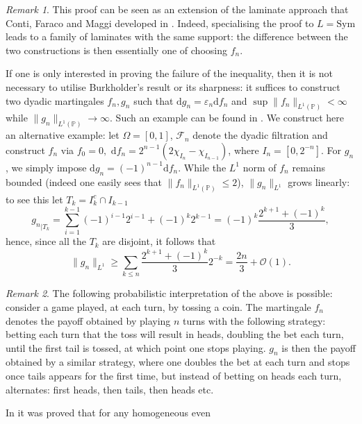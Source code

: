 \documentclass[11pt, a4paper, reqno]{elsarticle}
\theoremstyle{definition}
\theoremstyle{remark}
\newtheorem{remark}{Remark}
\begin{document}
 \begin{remark}
     This proof can be seen as an extension of
     the laminate approach that Conti, Faraco and Maggi
     developed in \cite{Conti2005AFunctions}.
     Indeed, specialising the proof to $L=\mathrm{Sym}$
     leads to a family of laminates with the same support:
     the difference between the two constructions is then essentially one of choosing $f_n$.
 \end{remark}
If one is only interested in proving the failure
 of the inequality, then it is not necessary to utilise Burkholder's result or its sharpness: it suffices to construct
 two dyadic martingales $f_n, g_n$ such that $\mathrm{d}g_n=\varepsilon_n \mathrm{d}f_n$
 and $\sup \|f_n\|_{L^1(\mathbb P)}<\infty$ while $\|g_n\|_{L^1(\mathbb P)}\to \infty.$ Such an example can be found in \cite[Section 3.2.2]{osekowski}. We construct
 here an alternative example: 
 let $\Omega=[0,1]$, $\mathcal F_n$
 denote the dyadic filtration and construct $f_n$ via $f_0=0,$
 $\mathrm{d}f_n=2^{n-1}(2\chi_{I_n}-\chi_{I_{n-1}})$, where $I_n=[0,2^{-n}]$.
For $g_n$, we simply impose $\mathrm{d}g_n=(-1)^{n-1}\mathrm{d}f_n.$
 While the $L^1$
 norm of $f_n$ remains bounded (indeed one easily sees that $\|f_n\|_{L^1(\mathbb P)}\le 2$), $\|g_n\|_{L^1}$ grows 
 linearly: to see this let $T_k=I_k^c\cap I_{k-1}$
\begin{equation*}
    {g_n}_{|T_k}=\sum_{i=1}^{k-1} (-1)^{i-1}2^{i-1}+(-1)^k 2^{k-1}=(-1)^k\frac{2^{k+1}+(-1)^k}{3},
\end{equation*}
hence, since all the $T_k$ are disjoint, it follows that
\begin{equation*}
    \|g_n\|_{L^1}\ge \sum_{k\le n} \frac{2^{k+1}+(-1)^k}{3} 2^{-k}
    =\frac {2n}3+\mathcal O(1).
\end{equation*}
\begin{remark}
The following probabilistic interpretation of the above is possible:
consider a game played, at each turn, by tossing a coin.
The martingale $f_n$ denotes the payoff obtained by playing
$n$ turns with the following strategy:
betting each turn that the toss will result in heads,
doubling the bet each turn,
until the first tail is tossed,
at which point one stops playing.
$g_n$ is then the payoff obtained by a similar strategy,
where one doubles the bet at each turn and stops
once tails appears for the first time,
but instead of betting on heads each turn, alternates:
first heads, then tails, then heads etc.
\end{remark}
In \cite{Geiss} it was proved that for any homogeneous even
\end{document}
